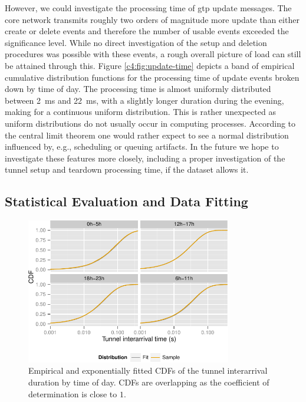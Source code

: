 However, we could investigate the processing time of \gls{gtp} update messages. The core network transmits roughly two orders of magnitude more update than either create or delete events and therefore the number of usable events exceeded the significance level. While no direct investigation of the setup and deletion procedures was possible with these events, a rough overall picture of load can still be attained through this. Figure \ref{c4:fig:update-time} depicts a band of empirical cumulative distribution functions for the processing time of update events broken down by time of day. The processing time is almost uniformly distributed between \SI{2}{\milli\second} and \SI{22}{\milli\second}, with a slightly longer duration during the evening, making for a continuous uniform distribution. This is rather unexpected as uniform distributions do not usually occur in computing processes. According to the central limit theorem one would rather expect to see a normal distribution influenced by, e.g., scheduling or queuing artifacts. In the future we hope to investigate these features more closely, including a proper investigation of the tunnel setup and teardown processing time, if the dataset allows it.



\subsection{Statistical Evaluation and Data Fitting}
\label{c4:sec:statistical_evaluation}


\begin{figure}[htb]
  \centering
  \includegraphics[width=0.8\textwidth]{images/R-IAT-active-fit-cdf-facets.pdf}
  \caption{Empirical and exponentially fitted \glspl{CDF} of the tunnel interarrival duration by time of day. \glspl{CDF} are overlapping as the coefficient of determination is close to $1$.}
  \label{fig:pdparrivalsecdf}
\end{figure}

